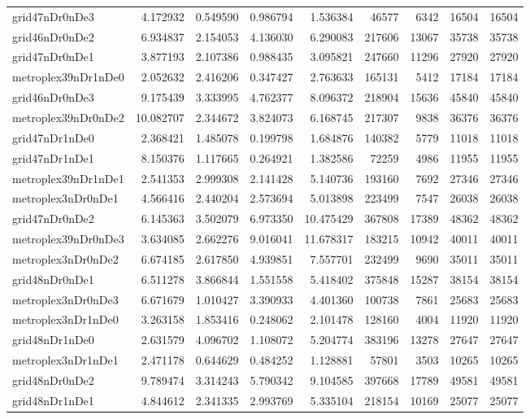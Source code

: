 \begin{longtable}{|l|r|r|r|r|r|r|r|r|}
grid47nDr0nDe3 & 4.172932 & 0.549590 & 0.986794 & 1.536384 & 46577 & 6342 & 16504 & 16504 \\
grid46nDr0nDe2 & 6.934837 & 2.154053 & 4.136030 & 6.290083 & 217606 & 13067 & 35738 & 35738 \\
grid47nDr0nDe1 & 3.877193 & 2.107386 & 0.988435 & 3.095821 & 247660 & 11296 & 27920 & 27920 \\
metroplex39nDr1nDe0 & 2.052632 & 2.416206 & 0.347427 & 2.763633 & 165131 & 5412 & 17184 & 17184 \\
grid46nDr0nDe3 & 9.175439 & 3.333995 & 4.762377 & 8.096372 & 218904 & 15636 & 45840 & 45840 \\
metroplex39nDr0nDe2 & 10.082707 & 2.344672 & 3.824073 & 6.168745 & 217307 & 9838 & 36376 & 36376 \\
grid47nDr1nDe0 & 2.368421 & 1.485078 & 0.199798 & 1.684876 & 140382 & 5779 & 11018 & 11018 \\
grid47nDr1nDe1 & 8.150376 & 1.117665 & 0.264921 & 1.382586 & 72259 & 4986 & 11955 & 11955 \\
metroplex39nDr1nDe1 & 2.541353 & 2.999308 & 2.141428 & 5.140736 & 193160 & 7692 & 27346 & 27346 \\
metroplex3nDr0nDe1 & 4.566416 & 2.440204 & 2.573694 & 5.013898 & 223499 & 7547 & 26038 & 26038 \\
grid47nDr0nDe2 & 6.145363 & 3.502079 & 6.973350 & 10.475429 & 367808 & 17389 & 48362 & 48362 \\
metroplex39nDr0nDe3 & 3.634085 & 2.662276 & 9.016041 & 11.678317 & 183215 & 10942 & 40011 & 40011 \\
metroplex3nDr0nDe2 & 6.674185 & 2.617850 & 4.939851 & 7.557701 & 232499 & 9690 & 35011 & 35011 \\
grid48nDr0nDe1 & 6.511278 & 3.866844 & 1.551558 & 5.418402 & 375848 & 15287 & 38154 & 38154 \\
metroplex3nDr0nDe3 & 6.671679 & 1.010427 & 3.390933 & 4.401360 & 100738 & 7861 & 25683 & 25683 \\
metroplex3nDr1nDe0 & 3.263158 & 1.853416 & 0.248062 & 2.101478 & 128160 & 4004 & 11920 & 11920 \\
grid48nDr1nDe0 & 2.631579 & 4.096702 & 1.108072 & 5.204774 & 383196 & 13278 & 27647 & 27647 \\
metroplex3nDr1nDe1 & 2.471178 & 0.644629 & 0.484252 & 1.128881 & 57801 & 3503 & 10265 & 10265 \\
grid48nDr0nDe2 & 9.789474 & 3.314243 & 5.790342 & 9.104585 & 397668 & 17789 & 49581 & 49581 \\
grid48nDr1nDe1 & 4.844612 & 2.341335 & 2.993769 & 5.335104 & 218154 & 10169 & 25077 & 25077 \\

\end{longtable}

